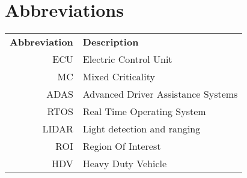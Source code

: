 \chapter*{Abbreviations}
\noindent{}\begin{tabular}{r  l}
\textbf{Abbreviation} 	& \textbf{Description} \vspace{.5em} \\
ECU		&Electric Control Unit\\
MC		&Mixed Criticality\\
ADAS	&Advanced Driver Assistance Systems\\
RTOS	&Real Time Operating System\\
LIDAR	&Light detection and ranging\\
ROI		&Region Of Interest\\
HDV		&Heavy Duty Vehicle\\
\end{tabular}